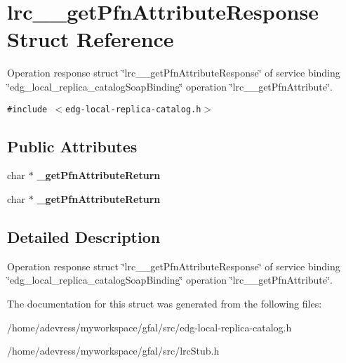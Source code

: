 \section{lrc\_\-\_\-get\-Pfn\-Attribute\-Response Struct Reference}
\label{structlrc____getPfnAttributeResponse}
Operation response struct \char`\"{}lrc\_\-\_\-get\-Pfn\-Attribute\-Response\char`\"{} of service binding \char`\"{}edg\_\-local\_\-replica\_\-catalog\-Soap\-Binding\char`\"{} operation \char`\"{}lrc\_\-\_\-get\-Pfn\-Attribute\char`\"{}.  


{\tt \#include $<$edg-local-replica-catalog.h$>$}

\subsection*{Public Attributes}
\begin{CompactItemize}
\item 
char $\ast$ \textbf{\_\-get\-Pfn\-Attribute\-Return}\label{structlrc____getPfnAttributeResponse_e6cba8841b096b841ec835119ebb7dfb}

\item 
char $\ast$ \textbf{\_\-get\-Pfn\-Attribute\-Return}\label{structlrc____getPfnAttributeResponse_e6cba8841b096b841ec835119ebb7dfb}

\end{CompactItemize}


\subsection{Detailed Description}
Operation response struct \char`\"{}lrc\_\-\_\-get\-Pfn\-Attribute\-Response\char`\"{} of service binding \char`\"{}edg\_\-local\_\-replica\_\-catalog\-Soap\-Binding\char`\"{} operation \char`\"{}lrc\_\-\_\-get\-Pfn\-Attribute\char`\"{}. 



The documentation for this struct was generated from the following files:\begin{CompactItemize}
\item 
/home/adevress/myworkspace/gfal/src/edg-local-replica-catalog.h\item 
/home/adevress/myworkspace/gfal/src/lrc\-Stub.h\end{CompactItemize}
